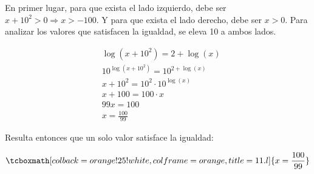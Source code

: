 \documentclass{article}
\newcommand{\hresult}[2]{\tcboxmath[colback=orange!25!white,colframe=orange, title=#1] {#2} }
\begin{document}
En primer lugar, para que exista el lado izquierdo, debe ser $ x + 10^2 > 0 \Rightarrow x > -100 $. Y para que exista el lado derecho, debe ser $ x > 0 $. Para analizar los valores que satisfacen la igualdad, se eleva 10 a ambos lados.

\begin{subequations}
\begin{align}
& \log( x + 10^2 ) = 2 + \log(x) \\
& 10^{ \log( x + 10^2 ) } = 10^{ 2 + \log(x) } \\
& x + 10^2 = 10^2 \cdot 10^{ \log(x) } \\
& x + 100 = 100 \cdot x \\
& 99x = 100 \\
& x = \frac{100}{99}
\end{align}
\end{subequations}

Resulta entonces que un solo valor satisface la igualdad:

\begin{equation}
\hresult{11.l}{ x = \frac{100}{99} }
\end{equation}
\end{document}
